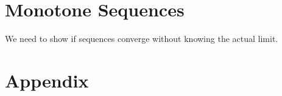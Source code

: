 \documentclass[12pt]{book}
\theoremstyle{definition}
\begin{document}


\section{Monotone Sequences}

We need to show if sequences converge without knowing the actual limit. 

\section{Appendix}

\end{document}
